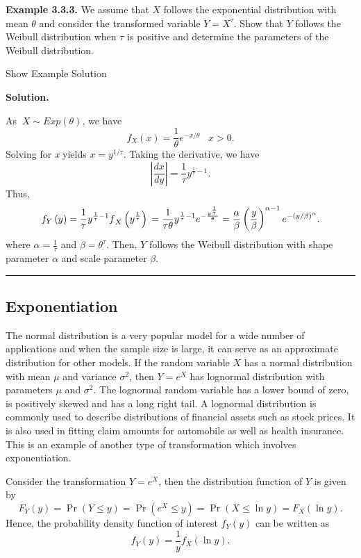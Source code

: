 \documentclass[]{book}
\theoremstyle{definition}
\theoremstyle{definition}
\theoremstyle{definition}
\theoremstyle{remark}
\begin{document}
\textbf{Example 3.3.3.} We assume that \(X\) follows the exponential
distribution with mean \(\theta\) and consider the transformed variable
\(Y = X^{\tau}\). Show that \(Y\) follows the Weibull distribution when
\(\tau\) is positive and determine the parameters of the Weibull
distribution.

Show Example Solution

\hypertarget{toggleExampleLoss.3.3}{}
\textbf{Solution.}

As \(\ X\sim Exp(\theta)\), we have
\[f_{X}(x) = \frac{1}{\theta}e^{- x/ \theta} \ \ \ \, x > 0.\] Solving
for \emph{x} yields \(x = y^{1/\tau}\). Taking the derivative, we have
\[\left| \frac{dx}{dy} \right| = \frac{1}{\tau}{y^{\frac{1}{\tau}-1}}.\]
Thus,
\[f_{Y}\left( y \right) = \frac{1}{\tau}{y^{\frac{1}{\tau} - 1}f}_{X}\left( y^{\frac{1}{\tau}} \right) \\
= \frac{1}{\tau \theta }y^{\frac{1}{\tau} - 1}e^{- \frac{y^{\frac{1}{\tau}}}{\theta}} = \frac{\alpha}{\beta}\left( \frac{y}{\beta} \right)^{\alpha - 1}e^{- \left( y/ \beta \right)^{\alpha}}.\]
where \(\alpha = \frac{1}{\tau}\) and \(\beta = \theta^{\tau}\). Then,
\(Y\) follows the Weibull distribution with shape parameter \(\alpha\)
and scale parameter \(\beta\).

\begin{center}\rule{0.5\linewidth}{\linethickness}\end{center}

\subsection{Exponentiation}\label{exponentiation}

The normal distribution is a very popular model for a wide number of
applications and when the sample size is large, it can serve as an
approximate distribution for other models. If the random variable \(X\)
has a normal distribution with mean \(\mu\) and variance \(\sigma^{2}\),
then \(Y = e^{X}\) has lognormal distribution with parameters \(\mu\)
and \(\sigma^{2}\). The lognormal random variable has a lower bound of
zero, is positively skewed and has a long right tail. A lognormal
distribution is commonly used to describe distributions of financial
assets such as stock prices. It is also used in fitting claim amounts
for automobile as well as health insurance. This is an example of
another type of transformation which involves exponentiation.

Consider the transformation \(Y = e^{X}\), then the distribution
function of \(Y\) is given by
\[F_{Y}\left( y \right) = \Pr\left( Y \leq y \right) = \Pr\left( e^{X} \leq y \right) = \Pr\left( X \leq \ln y \right) = F_{X}\left( \ln y \right).\]
Hence, the probability density function of interest \(f_{Y}(y)\) can be
written as \[f_{Y}(y) = \frac{1}{y}f_{X}\left( \ln y \right).\]
\end{document}
